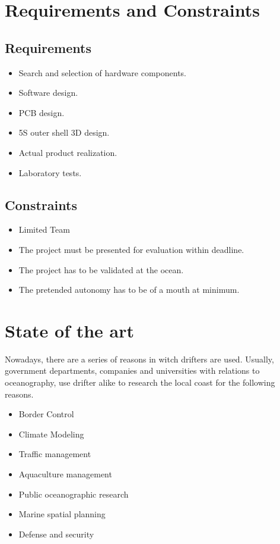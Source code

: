 \section{Requirements and Constraints}
\subsection{Requirements}
\begin{itemize}
    \item Search and selection of hardware components.
    \item Software design.
    \item PCB design.
    \item 5S outer shell 3D design.
    \item Actual product realization.
    \item Laboratory tests.
\end{itemize}
\subsection{Constraints}
\begin{itemize}
    \item Limited Team
    \item The project must be presented for evaluation within deadline.
    \item The project has to be validated at the ocean.
    \item The pretended autonomy has to be of a mouth at minimum.
\end{itemize}

\section{State of the art}
Nowadays, there are a series of reasons in witch drifters are used. Usually, government 
departments, companies and universities with relations to oceanography, use drifter alike 
to research the local coast for the following reasons.

\begin{itemize}
    \item Border Control
    \item Climate Modeling
    \item Traffic management
    \item Aquaculture management
    \item Public oceanographic research
    \item Marine spatial planning
    \item Defense and security
\end{itemize}


